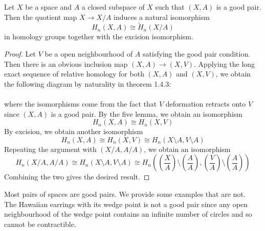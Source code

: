 \documentclass[a4paper]{article}
\begin{document}
\begin{prp}{}{} Let $X$ be a space and $A$ a closed subspace of $X$ such that $(X,A)$ is a good pair. Then the quotient map $X\to X/A$ induces a natural isomorphism $$H_n(X,A)\cong\widetilde{H}_n(X/A)$$ in homology groups together with the excision isomorphism. 
\begin{proof}
Let $V$ be a open neighbourhood of $A$ satisfying the good pair condition. Then there is an obvious inclusion map $(X,A)\to(X,V)$. Applying the long exact sequence of relative homology for both $(X,A)$ and $(X,V)$, we obtain the following diagram by naturality in theorem 1.4.3: \\
\\
where the isomorphisms come from the fact that $V$ deformation retracts onto $V$ since $(X,A)$ is a good pair. By the five lemma, we obtain an isomorphism $$H_n(X,A)\cong H_n(X,V)$$ By excision, we obtain another isomorphism $$H_n(X,A)\cong H_n(X,V)\cong H_n(X\setminus A,V\setminus A)$$ Repeating the argument with $(X/A,A/A)$, we obtain an isomorphism $$H_n(X/A,A/A)\cong H_n(X\setminus A,V\setminus A)\cong H_n\left(\left(\frac{X}{A}\right)\setminus\left(\frac{A}{A}\right),\left(\frac{V}{A}\right)\setminus\left(\frac{A}{A}\right)\right)$$ Combining the two gives the desired result. 
\end{proof}
\end{prp}

Most pairs of spaces are good pairs. We provide some examples that are not. \\

The Hawaiian earrings with its wedge point is not a good pair since any open neighbourhood of the wedge point contains an infinite number of circles and so cannot be contractible. \\
\end{document}
